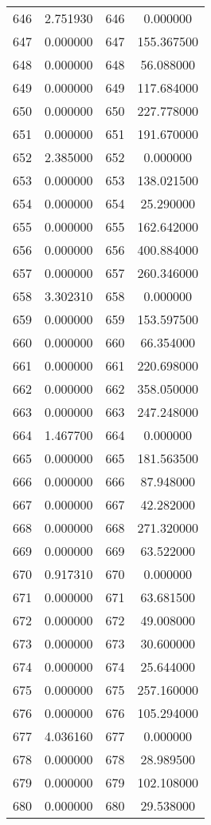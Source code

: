 \documentclass[12pt]{article}
\begin{document}
\begin{longtable}{@{}cccc@{}}
646 & 2.751930 & 646 & 0.000000 \\
647 & 0.000000 & 647 & 155.367500 \\
648 & 0.000000 & 648 & 56.088000 \\
649 & 0.000000 & 649 & 117.684000 \\
650 & 0.000000 & 650 & 227.778000 \\
651 & 0.000000 & 651 & 191.670000 \\
652 & 2.385000 & 652 & 0.000000 \\
653 & 0.000000 & 653 & 138.021500 \\
654 & 0.000000 & 654 & 25.290000 \\
655 & 0.000000 & 655 & 162.642000 \\
656 & 0.000000 & 656 & 400.884000 \\
657 & 0.000000 & 657 & 260.346000 \\
658 & 3.302310 & 658 & 0.000000 \\
659 & 0.000000 & 659 & 153.597500 \\
660 & 0.000000 & 660 & 66.354000 \\
661 & 0.000000 & 661 & 220.698000 \\
662 & 0.000000 & 662 & 358.050000 \\
663 & 0.000000 & 663 & 247.248000 \\
664 & 1.467700 & 664 & 0.000000 \\
665 & 0.000000 & 665 & 181.563500 \\
666 & 0.000000 & 666 & 87.948000 \\
667 & 0.000000 & 667 & 42.282000 \\
668 & 0.000000 & 668 & 271.320000 \\
669 & 0.000000 & 669 & 63.522000 \\
670 & 0.917310 & 670 & 0.000000 \\
671 & 0.000000 & 671 & 63.681500 \\
672 & 0.000000 & 672 & 49.008000 \\
673 & 0.000000 & 673 & 30.600000 \\
674 & 0.000000 & 674 & 25.644000 \\
675 & 0.000000 & 675 & 257.160000 \\
676 & 0.000000 & 676 & 105.294000 \\
677 & 4.036160 & 677 & 0.000000 \\
678 & 0.000000 & 678 & 28.989500 \\
679 & 0.000000 & 679 & 102.108000 \\
680 & 0.000000 & 680 & 29.538000 \\

\end{longtable}
\end{document}
